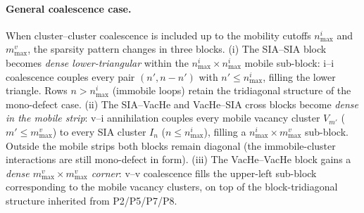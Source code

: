 \paragraph{General coalescence case.}
When cluster--cluster coalescence is included up to the mobility
cutoffs $n_{\max}^i$ and $m_{\max}^v$, the sparsity pattern changes
in three blocks. (i) The SIA--SIA block becomes
\emph{dense lower-triangular} within the $n_{\max}^i \times n_{\max}^i$
mobile sub-block: i--i coalescence couples every pair $(n', n-n')$ with
$n' \leq n_{\max}^i$, filling the lower triangle. Rows $n > n_{\max}^i$
(immobile loops) retain the tridiagonal structure of the mono-defect
case. (ii) The SIA--VacHe and VacHe--SIA cross blocks become \emph{dense
in the mobile strip}: v--i annihilation couples every mobile vacancy
cluster $V_{m'}$ ($m' \leq m_{\max}^v$) to every SIA cluster $I_n$
($n \leq n_{\max}^i$), filling a $n_{\max}^i \times m_{\max}^v$
sub-block. Outside the mobile strips both blocks remain diagonal (the
immobile-cluster interactions are still mono-defect in form). (iii) The
VacHe--VacHe block gains a \emph{dense $m_{\max}^v \times m_{\max}^v$
corner}: v--v coalescence fills the upper-left sub-block corresponding
to the mobile vacancy clusters, on top of the block-tridiagonal
structure inherited from P2/P5/P7/P8.

